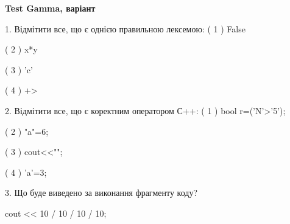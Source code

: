 \documentclass[11pt, ukrainian]{article}
\begin{document}
\vspace{20mm}
\begin{large}
\textbf{Test Gamma, варіант }\par

1. Відмітити все, що є однією правильною лексемою:
( 1 ) False

( 2 ) x*y

( 3 ) 'c'

( 4 ) +>


2. Відмітити все, що є коректним оператором С++:
( 1 ) bool r=('N'>'5');

( 2 ) "a"=6;

( 3 ) cout<<"\n";

( 4 ) 'a'=3;


3. Що буде виведено за виконання фрагменту коду?

cout << 10 / 10 / 10 / 10;

\end{large}
\newpage
\end{document}
